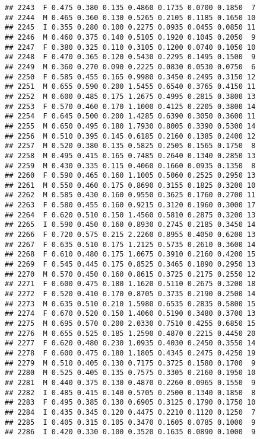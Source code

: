 \documentclass[
]{article}
\begin{document}
\begin{verbatim}
## 2243  F 0.475 0.380 0.135 0.4860 0.1735 0.0700 0.1850  7
## 2244  M 0.465 0.360 0.130 0.5265 0.2105 0.1185 0.1650 10
## 2245  I 0.355 0.280 0.100 0.2275 0.0935 0.0455 0.0850 11
## 2246  M 0.460 0.375 0.140 0.5105 0.1920 0.1045 0.2050  9
## 2247  F 0.380 0.325 0.110 0.3105 0.1200 0.0740 0.1050 10
## 2248  F 0.470 0.365 0.120 0.5430 0.2295 0.1495 0.1500  9
## 2249  M 0.360 0.270 0.090 0.2225 0.0830 0.0530 0.0750  6
## 2250  F 0.585 0.455 0.165 0.9980 0.3450 0.2495 0.3150 12
## 2251  M 0.655 0.590 0.200 1.5455 0.6540 0.3765 0.4150 11
## 2252  M 0.600 0.485 0.175 1.2675 0.4995 0.2815 0.3800 13
## 2253  F 0.570 0.460 0.170 1.1000 0.4125 0.2205 0.3800 14
## 2254  F 0.645 0.500 0.200 1.4285 0.6390 0.3050 0.3600 11
## 2255  M 0.650 0.495 0.180 1.7930 0.8005 0.3390 0.5300 14
## 2256  M 0.510 0.395 0.145 0.6185 0.2160 0.1385 0.2400 12
## 2257  M 0.520 0.380 0.135 0.5825 0.2505 0.1565 0.1750  8
## 2258  M 0.495 0.415 0.165 0.7485 0.2640 0.1340 0.2850 13
## 2259  M 0.430 0.335 0.115 0.4060 0.1660 0.0935 0.1350  8
## 2260  F 0.590 0.465 0.160 1.1005 0.5060 0.2525 0.2950 13
## 2261  M 0.550 0.460 0.175 0.8690 0.3155 0.1825 0.3200 10
## 2262  M 0.585 0.430 0.160 0.9550 0.3625 0.1760 0.2700 11
## 2263  F 0.580 0.455 0.160 0.9215 0.3120 0.1960 0.3000 17
## 2264  F 0.620 0.510 0.150 1.4560 0.5810 0.2875 0.3200 13
## 2265  I 0.590 0.450 0.160 0.8930 0.2745 0.2185 0.3450 14
## 2266  F 0.720 0.575 0.215 2.2260 0.8955 0.4050 0.6200 13
## 2267  F 0.635 0.510 0.175 1.2125 0.5735 0.2610 0.3600 14
## 2268  F 0.610 0.480 0.175 1.0675 0.3910 0.2160 0.4200 15
## 2269  F 0.545 0.445 0.175 0.8525 0.3465 0.1890 0.2950 13
## 2270  M 0.570 0.450 0.160 0.8615 0.3725 0.2175 0.2550 12
## 2271  F 0.600 0.475 0.180 1.1620 0.5110 0.2675 0.3200 18
## 2272  F 0.520 0.410 0.170 0.8705 0.3735 0.2190 0.2500 14
## 2273  M 0.635 0.510 0.210 1.5980 0.6535 0.2835 0.5800 15
## 2274  F 0.670 0.520 0.150 1.4060 0.5190 0.3480 0.3700 13
## 2275  M 0.695 0.570 0.200 2.0330 0.7510 0.4255 0.6850 15
## 2276  M 0.655 0.525 0.185 1.2590 0.4870 0.2215 0.4450 20
## 2277  F 0.620 0.480 0.230 1.0935 0.4030 0.2450 0.3550 14
## 2278  F 0.600 0.475 0.180 1.1805 0.4345 0.2475 0.4250 19
## 2279  M 0.510 0.405 0.130 0.7175 0.3725 0.1580 0.1700  9
## 2280  M 0.525 0.405 0.135 0.7575 0.3305 0.2160 0.1950 10
## 2281  M 0.440 0.375 0.130 0.4870 0.2260 0.0965 0.1550  9
## 2282  I 0.485 0.415 0.140 0.5705 0.2500 0.1340 0.1850  8
## 2283  F 0.495 0.385 0.130 0.6905 0.3125 0.1790 0.1750 10
## 2284  I 0.435 0.345 0.120 0.4475 0.2210 0.1120 0.1250  7
## 2285  I 0.405 0.315 0.105 0.3470 0.1605 0.0785 0.1000  9
## 2286  I 0.420 0.330 0.100 0.3520 0.1635 0.0890 0.1000  9

\end{verbatim}
\end{document}
